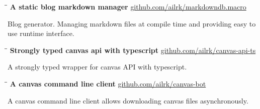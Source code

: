 \documentclass{res}
\begin{document}
\begin{resume}
    \vspace{-0.1in}
    \begin{tabbing}
        \hspace{2.4in}\= \hspace{0.9in}\= \kill
        {\bf A static blog markdown manager} \>               \>\url{github.com/ailrk/markdowndb.macro}\\
    \end{tabbing}\vspace{-30pt}
    Blog generator.
    Managing markdown files at compile time and providing easy to use runtime interface.

    \vspace{-0.2in}
    \begin{tabbing}
        \hspace{2.4in}\= \hspace{0.9in}\= \kill
        {\bf Strongly typed canvas api with typescript} \>               \>\url{github.com/ailrk/canvas-api-ts}\\

    \end{tabbing}\vspace{-30pt}
    A strongly typed wrapper for canvas API with typescript.

    \vspace{-0.2in}
    \begin{tabbing}
        \hspace{2.4in}\= \hspace{0.9in}\= \kill
        {\bf A canvas command line client} \>               \>\url{github.com/ailrk/canvas-bot}\\

    \end{tabbing}\vspace{-30pt}
    A canvas command line client allows downloading canvas files asynchronously.



\end{resume}
\end{document}
